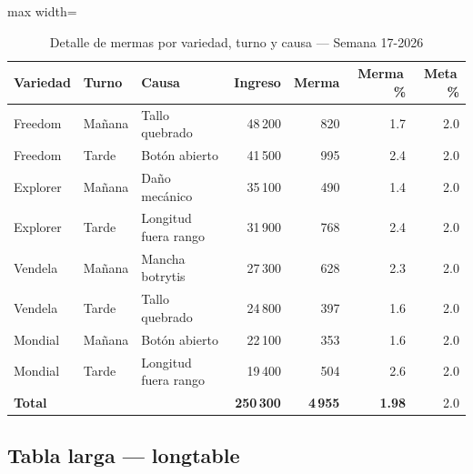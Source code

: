 \documentclass{../base/canon}
\begin{document}
\begin{table}[H]
  \centering
  \caption{Detalle de mermas por variedad, turno y causa — Semana 17-2026}
  \begin{adjustbox}{max width=\linewidth}
  \begin{tabular}{l l l r r r r}
    \toprule
    \textbf{Variedad} & \textbf{Turno} & \textbf{Causa} &
    \textbf{Ingreso} & \textbf{Merma} & \textbf{Merma\,\%} & \textbf{Meta\,\%} \\
    \midrule
    Freedom   & Mañana & Tallo quebrado       & 48\,200 & 820  & 1.7 & 2.0 \\
    Freedom   & Tarde  & Botón abierto        & 41\,500 & 995  & 2.4 & 2.0 \\
    Explorer  & Mañana & Daño mecánico        & 35\,100 & 490  & 1.4 & 2.0 \\
    Explorer  & Tarde  & Longitud fuera rango & 31\,900 & 768  & 2.4 & 2.0 \\
    Vendela   & Mañana & Mancha botrytis      & 27\,300 & 628  & 2.3 & 2.0 \\
    Vendela   & Tarde  & Tallo quebrado       & 24\,800 & 397  & 1.6 & 2.0 \\
    Mondial   & Mañana & Botón abierto        & 22\,100 & 353  & 1.6 & 2.0 \\
    Mondial   & Tarde  & Longitud fuera rango & 19\,400 & 504  & 2.6 & 2.0 \\
    \midrule
    \multicolumn{3}{l}{\textbf{Total}} &
      \textbf{250\,300} & \textbf{4\,955} & \textbf{1.98} & 2.0 \\
    \bottomrule
  \end{tabular}
  \end{adjustbox}
\end{table}

\subsection{Tabla larga — longtable}
\end{document}
